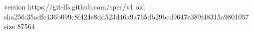 version https://git-lfs.github.com/spec/v1
oid sha256:35adfe436b099c8f424e8dd523d46a9a765db29bcd9647e389f48315a9801057
size 87564
